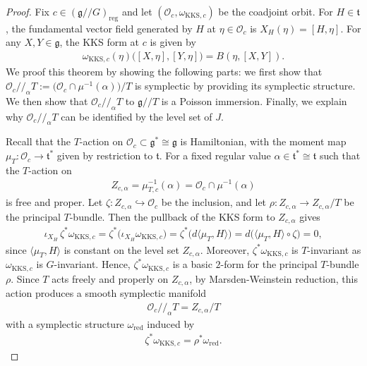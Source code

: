 \documentclass[11pt,reqno]{amsart}
\newtheorem*{theorem A}{Main Theorem A}
\newtheorem*{theorem B}{Main Theorem B}
\newtheorem*{theorem C}{Main Theorem C}
\newtheorem*{theorem D}{Main Theorem D}
\theoremstyle{definition}
\theoremstyle{plain}
\theoremstyle{conclusion}
\begin{document}
\begin{proof}
  Fix $c\in(\mathfrak{g}//G)_{\mathrm{reg}}$ and let $(\mathcal{O}_c,\omega_{\mathrm{KKS},c})$ be the coadjoint orbit. For $H \in \mathfrak{t}$, the fundamental vector field generated by $H$ at $\eta\in\mathcal{O}_c$ is $X_H(\eta)=[H,\eta]$. For any $X,Y \in \mathfrak{g}$, the KKS form at $c$ is given by \begin{align*}
  \omega_{\mathrm{KKS},c}(\eta)\big([X,\eta],[Y,\eta]\big)=B(\eta,[X,Y]).
\end{align*} We proof this theorem by showing the following parts: we first show that $\mathcal{O}_c//_\alpha T  :=\bigl(\mathcal{O}_c \cap \mu^{-1}(\alpha)\bigr)\big/  T$ is symplectic by providing its symplectic structure. We then show that $\mathcal{O}_c//_\alpha T$ to $\mathfrak{g}//T$ is a Poisson immersion. Finally, we explain why $\mathcal{O}_c//_\alpha T $ can be identified by the level set of $J$.

Recall that the $T$-action on $\mathcal{O}_c \subset \mathfrak{g}^*\cong\mathfrak{g}$ is Hamiltonian, with the moment map $\mu_T:\mathcal{O}_c \rightarrow \mathfrak{t}^*$ given by restriction to $\mathfrak{t}$. For a fixed regular value $\alpha \in \mathfrak{t}^*\cong\mathfrak{t}$ such that the $T$-action on \begin{align*}
Z_{c,\alpha} = \mu_{T,c}^{-1}(\alpha) = \mathcal{O}_c \cap \mu^{-1}(\alpha)
\end{align*}
is free and proper. Let $\zeta: Z_{c,\alpha}\hookrightarrow \mathcal{O}_c$ be the inclusion, and let
$\rho: Z_{c,\alpha} \rightarrow Z_{c,\alpha}/T$ be the principal $T$-bundle. Then the pullback of the KKS form to $Z_{c,\alpha}$ gives \begin{align*}
\iota_{X_H}\,\zeta^*\omega_{\mathrm{KKS},c} =\zeta^*\big(\iota_{X_H}\omega_{\mathrm{KKS},c}\big) =\zeta^*\big(d\langle \mu_T,H\rangle\big) =d\big(\langle \mu_T,H\rangle\circ \zeta\big)=0,
\end{align*} since $\langle\mu_T,H\rangle$ is constant on the level set $Z_{c,\alpha}$. Moreover, $\zeta^*\omega_{\mathrm{KKS},c}$ is $T$-invariant as $\omega_{\mathrm{KKS},c}$ is $G$-invariant. Hence, $\zeta^*\omega_{\mathrm{KKS},c}$ is a basic $2$-form for the principal $T$-bundle $\rho$. Since $T$ acts freely and properly on $Z_{c,\alpha}$, by Marsden-Weinstein reduction, this action produces a smooth symplectic manifold
\begin{align*}
\mathcal{O}_c//_\alpha T  = Z_{c,\alpha}/T
\end{align*}
with a symplectic structure $\omega_{\mathrm{red}}$ induced by
\begin{align*}
\zeta^*\omega_{\mathrm{KKS},c} = \rho^*\omega_{\mathrm{red}}.
\end{align*}


\end{proof}
\end{document}
